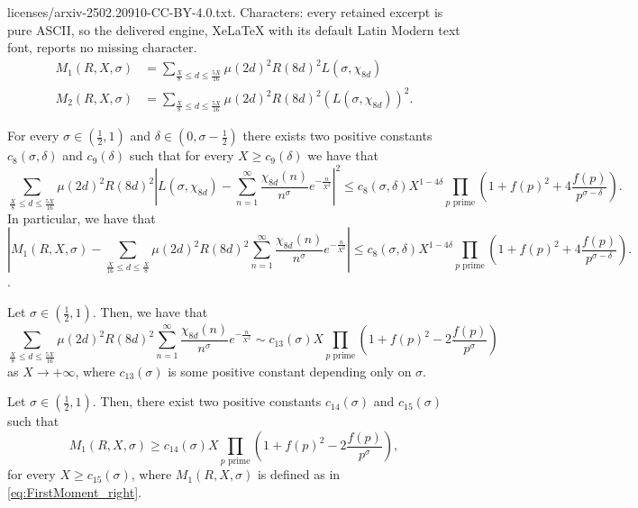 \documentclass[10pt,a4paper]{amsart}
\begin{document}
licenses/arxiv-2502.20910-CC-BY-4.0.txt. Characters: every retained excerpt is pure ASCII, so the delivered engine, XeLaTeX with its default Latin Modern text font, reports no missing character.
\begin{align}
    M_1(R,X,\sigma) &= \sum_{\frac{X}{8}\leq d\leq \frac{5X}{16}}\mu(2d)^2R(8d)^2 L(\sigma,\chi_{8d}) \label{eq:FirstMoment_right} \\
    M_2(R,X,\sigma) &= \sum_{\frac{X}{8}\leq d\leq \frac{5X}{16}} \mu(2d)^2 R(8d)^2 (L(\sigma,\chi_{8d}))^2. \label{eq:SecondMoment_right} 
\end{align}

\begin{proposition}
\label{L-function approximation}
For every $\sigma \in (\frac{1}{2},1)$ and $\delta \in \left(0, \sigma-\frac{1}{2}\right)$ there exists two positive constants $c_8(\sigma,\delta)$ and $c_9(\delta)$ such that for every $X \geq c_9(\delta)$ we have that
\begin{equation}\label{error}
\sum_{\frac{X}{8}\leq d\leq \frac{5X}{16}}\mu(2d)^2R(8d)^2\left|L(\sigma,\chi_{8d})-\sum_{n=1}^{\infty}\frac{\chi_{8d}(n)}{n^\sigma} e^{-\frac{n}{X^2}}\right|^2 \leq c_8(\sigma,\delta) X^{1-4\delta}\prod_{p\text{ prime}}\left(1+f(p)^2+4\frac{f(p)}{p^{\sigma-\delta}}\right).
\end{equation}
In particular, we have that
\[
\left\lvert M_1(R,X,\sigma) - \sum_{\frac{X}{16}\leq d\leq \frac{X}{8}}\mu(2d)^2R(8d)^2\sum_{n=1}^{\infty}\frac{\chi_{8d}(n)}{n^\sigma} e^{-\frac{n}{X^2}} \right\rvert \leq c_8(\sigma,\delta) X^{1-4\delta}\prod_{p\text{ prime}}\left(1+f(p)^2+4\frac{f(p)}{p^{\sigma-\delta}}\right).
\].
\end{proposition}

\begin{lemma}\label{M1 approximation}
Let $\sigma \in \left( \frac{1}{2},1 \right)$. Then, we have that
\begin{equation}\label{eq M1 approx}
\sum_{\frac{X}{8}\leq d\leq \frac{5X}{16}}\mu(2d)^2R(8d)^2\sum_{n=1}^{\infty}\frac{\chi_{8d}(n)}{n^\sigma} e^{-\frac{n}{X^2}} \sim c_{13}(\sigma) X\prod_{p\text{ prime}}\left(1+f(p)^2-2\frac{f(p)}{p^{\sigma}}\right)   
\end{equation}
as $X \to +\infty$, where $c_{13}(\sigma)$ is some positive constant depending only on $\sigma$.
\end{lemma}

\begin{theorem}\label{M1alpha}
Let $\sigma \in \left( \frac{1}{2},1 \right)$. Then, there exist two positive constants $c_{14}(\sigma)$ and $c_{15}(\sigma)$ such that
\begin{equation*}
M_1(R,X,\sigma)
\geq c_{14}(\sigma) X\prod_{p\text{ prime}}\left(1+f(p)^2-2\frac{f(p)}{p^{\sigma}}\right),
\end{equation*}
for every $X \geq c_{15}(\sigma)$, where $M_1(R,X,\sigma)$ is defined as in \eqref{eq:FirstMoment_right}.
\end{theorem}
\end{document}
